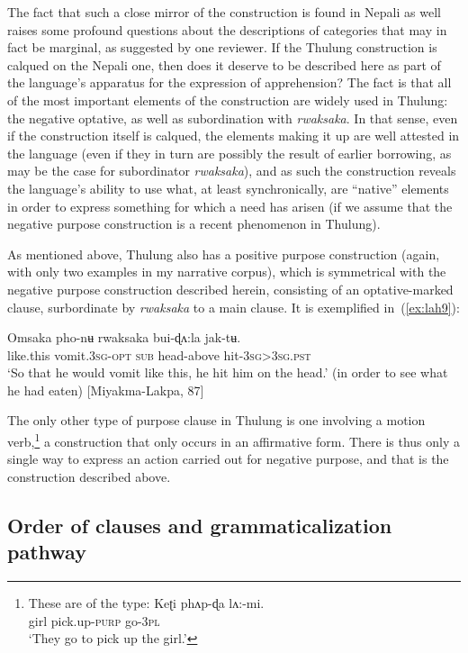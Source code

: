 \documentclass[output=paper,colorlinks,citecolor=brown,
]{langscibook}
\begin{document}
The fact that such a close mirror of the construction is found in Nepali as well raises some profound questions about the descriptions of categories that may in fact be marginal, as suggested by one reviewer. If the Thulung construction is calqued on the Nepali one, then does it deserve to be described here as part of the language's apparatus for the expression of apprehension? The fact is that all of the most important elements of the construction are widely used in Thulung: the negative optative, as well as subordination with \textit{rwaksaka}. In that sense, even if the construction itself is calqued, the elements making it up are well attested in the language (even if they in turn are possibly the result of earlier borrowing, as may be the case for subordinator \textit{rwaksaka}), and as such the construction reveals the language's ability to use what, at least synchronically, are ``native'' elements in order to express something for which a need has arisen (if we assume that the negative purpose construction is a recent phenomenon in Thulung).

As mentioned above, Thulung also has a positive purpose construction (again, with only two examples in my narrative corpus), which is symmetrical with the negative purpose construction described herein, consisting of an optative-marked clause, surbordinate by \textit{rwaksaka} to a main clause. It is exemplified in~(\ref{ex:lah9}):


\ea \label{ex:lah9}
\gll Omsaka pho-nʉ rwaksaka bui-ɖʌ:la jak-tʉ. \\
like.this vomit.\textsc{3sg-opt} \textsc{sub}  head-above hit-\textsc{3sg>3sg.pst} \\
\glt `So that he would vomit like this, he hit him on the head.' (in order to see what he had eaten) [Miyakma-Lakpa, 87]
\z

The only other type of purpose clause in Thulung is one involving a motion verb,\footnote{These are of the type:
\ea \label{footnoteex3}
\gll Keʈi phʌp-ɖa lʌ:-mi. \\
girl pick.up-\textsc{purp} go-\textsc{3pl} \\
\glt `They go to pick up the girl.'
\z} a construction that only occurs in an affirmative form. There is thus only a single way to express an action carried out for negative purpose, and that is the construction described above.



\subsection{Order of clauses and grammaticalization pathway}
\label{subsec:order}
\end{document}
